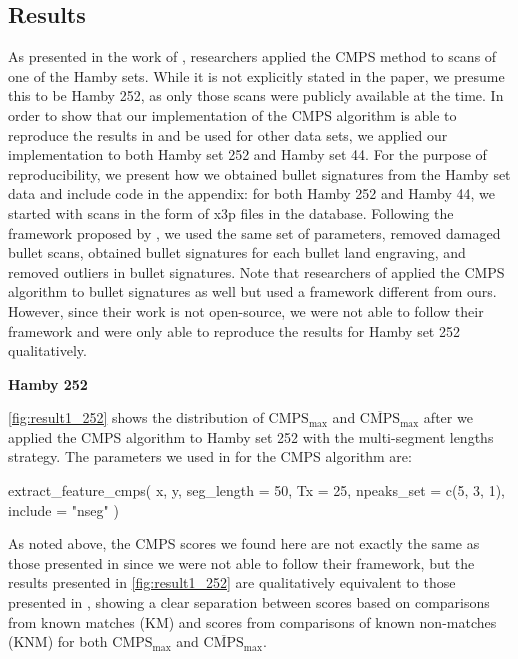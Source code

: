 \hypertarget{results}{%
\subsection{Results}\label{results}}

As presented in the work of \citet{cmps}, researchers applied the CMPS
method to scans of one of the Hamby sets. While it is not explicitly
stated in the paper, we presume this to be Hamby 252, as only those
scans were publicly available at the time. In order to show that our
implementation of the CMPS algorithm is able to reproduce the results in
\citet{cmps} and be used for other data sets, we applied our
implementation to both Hamby set 252 and Hamby set 44. For the purpose
of reproducibility, we present how we obtained bullet signatures from
the Hamby set data and include code in the appendix: for both Hamby 252
and Hamby 44, we started with scans in the form of x3p files in the
database. Following the framework proposed by \citet{aoas}, we used the
same set of parameters, removed damaged bullet scans, obtained bullet
signatures for each bullet land engraving, and removed outliers in
bullet signatures. Note that researchers of \citet{cmps} applied the
CMPS algorithm to bullet signatures as well but used a framework
different from ours. However, since their work is not open-source, we
were not able to follow their framework and were only able to reproduce
the results for Hamby set 252 qualitatively.

\textbf{Hamby 252}

\autoref{fig:result1_252} shows the distribution of
\(\mathrm{CMPS_{max}}\) and \(\mathrm{\overline{CMPS}_{max}}\) after we
applied the CMPS algorithm to Hamby set 252 with the multi-segment
lengths strategy. The parameters we used in
 for the CMPS algorithm are:

\begin{Schunk}
\begin{Sinput}
extract_feature_cmps(
  x, y,
  seg_length = 50,
  Tx = 25,
  npeaks_set = c(5, 3, 1),
  include = "nseg"
)
\end{Sinput}
\end{Schunk}

As noted above, the CMPS scores we found here are not exactly the same
as those presented in \citet{cmps} since we were not able to follow
their framework, but the results presented in \autoref{fig:result1_252}
are qualitatively equivalent to those presented in \citet{cmps}, showing
a clear separation between scores based on comparisons from known
matches (KM) and scores from comparisons of known non-matches (KNM) for
both \(\mathrm{CMPS_{max}}\) and \(\mathrm{\overline{CMPS}_{max}}\).

